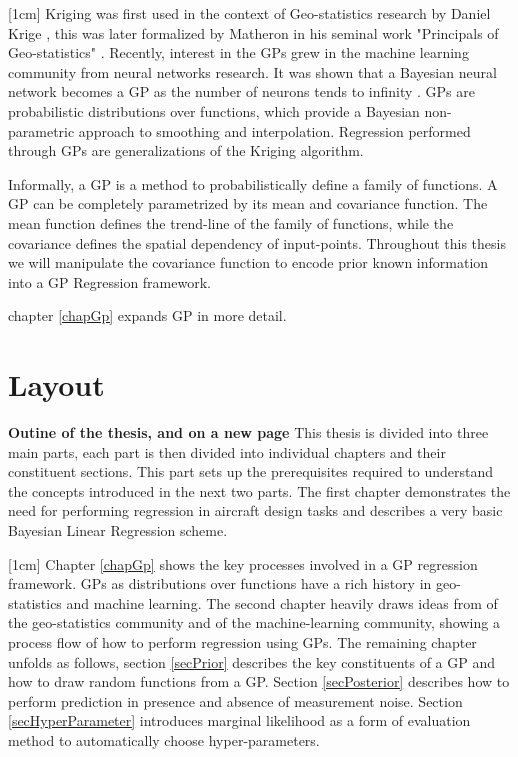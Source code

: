 [1cm]
Kriging was first used in the context of Geo-statistics research by Daniel Krige \cite{krige1951statistical}, this was later formalized by Matheron in his seminal work "Principals of Geo-statistics" \cite{matheron1963principles}. Recently, interest in the GPs grew in the machine learning community from neural networks research. It was shown that a Bayesian neural network becomes a GP as the number of neurons tends to infinity \cite{neal2012bayesian}. GPs are probabilistic distributions over functions, which provide a Bayesian non-parametric approach to smoothing and interpolation. Regression performed through GPs are generalizations of the Kriging algorithm. 

Informally, a GP is a method to probabilistically define a family of functions. A GP can be completely parametrized by its mean and covariance function. The mean function defines the trend-line of the family of functions, while the covariance defines the spatial dependency of input-points. Throughout this thesis we will manipulate the covariance function to encode prior known information into a GP Regression framework. 


chapter \ref{chapGp} expands GP in more detail. 

\section{Layout}\label{secOutline}
\textbf{Outine of the thesis, and on a new page}
This thesis is divided into three main parts, each part is then divided into individual chapters and their constituent sections. This part sets up the prerequisites required to understand the concepts introduced in the next two parts. The first chapter demonstrates the need for performing regression in aircraft design tasks and describes a very basic Bayesian Linear Regression scheme. 

[1cm]
Chapter \ref{chapGp} shows the key processes involved in a GP regression framework. GPs as distributions over functions have a rich history in geo-statistics and machine learning. The second chapter heavily draws ideas from \cite{krige1951statistical, matheron1963principles} of the geo-statistics community and \cite{Stein1999Springer, kennedy2000predicting, Rasmussen2005, mackay2003information} of the machine-learning community, showing a process flow of how to perform regression using GPs. The remaining chapter unfolds as follows, section \ref{secPrior} describes the key constituents of a GP and how to draw random functions from a GP. Section \ref{secPosterior} describes how to perform prediction in presence and absence of measurement noise. Section \ref{secHyperParameter} introduces marginal likelihood as a form of evaluation method to automatically choose hyper-parameters. 

